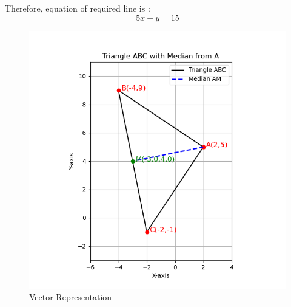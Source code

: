 \documentclass[journal]{IEEEtran}
\begin{document}
Therefore, equation of required line is  :\[
\boxed{5x + y = 15}
\]

\begin{figure}[htbp]
    \centering
    \includegraphics[width=0.65\linewidth]{FIG/fig1.png}
    \caption{Vector Representation}
    \label{fig:FIG/fig1.png}
    \end{figure}
\end{document}
